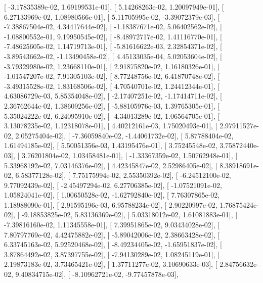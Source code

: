 \documentclass{article}
\begin{document}
       [ -3.17835389e-02,   1.69199531e-01],
       [  5.14268263e-02,   1.20097949e-01],
       [  6.27133969e-02,   1.08980566e-01],
       [  5.11705995e-02,  -3.39072379e-03],
       [ -7.38867504e-02,   4.34417644e-02],
       [ -1.18387671e-02,   5.06402562e-02],
       [ -1.08800552e-01,   9.19950545e-02],
       [ -8.48972717e-02,   1.41116770e-01],
       [ -7.48625605e-02,   1.14719713e-01],
       [ -5.81616622e-03,   2.32854371e-02],
       [ -3.89543662e-02,  -1.13490458e-02],
       [  4.45133035e-04,   5.02053604e-02],
       [ -3.79329980e-02,   1.23668110e-01],
       [  2.91875820e-02,   1.16180326e-01],
       [ -1.01547207e-02,   7.91305103e-02],
       [  8.77248756e-02,   6.41870748e-02],
       [ -3.49315528e-02,   1.83168506e-02],
       [  4.70540701e-02,   1.24412344e-01],
       [  4.63086729e-03,   5.85354048e-02],
       [ -2.17407251e-02,  -1.17414711e-02],
       [  2.36762644e-02,   1.38609256e-02],
       [ -5.88105976e-03,   1.39765305e-01],
       [  5.35024222e-02,   6.24095910e-02],
       [ -4.34013289e-02,   1.06564705e-01],
       [  3.13078235e-02,   1.12318078e-01],
       [  4.40212161e-03,   1.75020493e-01],
       [  2.97911527e-02,   2.05275404e-02],
       [ -7.36059840e-02,  -1.44061732e-02],
       [  5.87788404e-02,   1.61494185e-02],
       [  5.50051356e-03,   1.43195476e-01],
       [  3.75245548e-02,   3.75872440e-03],
       [  3.76201804e-02,   1.03458481e-01],
       [ -1.33367359e-02,   1.50762948e-01],
       [  5.33968192e-02,   7.03146376e-02],
       [  4.42345847e-02,   2.52986405e-02],
       [  8.38918691e-02,   6.58377128e-02],
       [  7.75175994e-02,   2.55350392e-02],
       [ -6.24512100e-02,   9.77092439e-02],
       [ -2.45497294e-02,   6.27706385e-02],
       [ -1.07521091e-02,   1.05824041e-02],
       [  1.00650528e-02,  -1.62792840e-02],
       [  7.76307865e-02,   1.18988090e-01],
       [  2.91595196e-03,   6.95788234e-02],
       [  2.90220997e-02,   1.76875424e-02],
       [ -9.18853825e-02,   5.83136369e-02],
       [  5.03318012e-02,   1.61081883e-01],
       [ -7.39816160e-02,   1.11345558e-01],
       [  7.39951865e-02,   9.03434028e-02],
       [  7.80797769e-02,   4.42475882e-02],
       [ -5.89042006e-02,   2.38663428e-02],
       [  6.33745163e-02,   5.92520468e-02],
       [ -8.49234405e-02,  -1.65951837e-02],
       [  3.87864492e-02,   3.87397755e-02],
       [ -7.94130289e-02,   1.08245119e-01],
       [  2.19873183e-02,   3.73465421e-02],
       [  1.37711277e-02,   3.10690633e-03],
       [  2.84756632e-02,   9.40834715e-02],
       [ -8.10962721e-02,  -9.77457878e-03],
\end{document}
